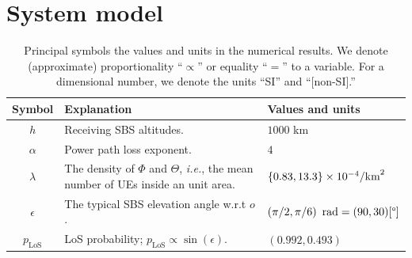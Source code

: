 \documentclass[lettersize,journal]{IEEEtran}
\newcommand{\rEarth}{R_{\oplus}}
\newcommand{\R}{\mathbb{R}}
\begin{document}







\section{System model}


\begin{table}
   \captionsetup{size=footnotesize}
   \caption{Principal symbols the values and units in the numerical results. We denote (approximate) proportionality ``$\propto$'' or equality ``$=$'' to a variable. For a dimensional number, we denote the units ``SI'' and ``[non-SI].''}
     \label{table:parameters}
  \begin{center}
    \begin{tabular}{c|p{4.5cm}|p{1.9cm}}
      \toprule
      Symbol& Explanation &Values and units
      \\ 
      \hline 
      $h$ & Receiving SBS altitudes. &$1000$ km  \\
      $\alpha$ &Power path loss exponent.& $4$\\
      $\lambda$ & The density of $\Phi$ and $\Theta$, \textit{i.e.}, the mean number of UEs inside an unit area.&$\{0.83,13.3\} \times\break 10^{-4}\text{/km}^2$\\
      $\epsilon$& The typical SBS elevation angle w.r.t $\textit{o}$.&$\left({\pi}/{2},{\pi}/{6}\right)\text{ rad}\break=(90,30)[\degree]$\\
      $p_{\text{LoS}}$& LoS probability; $p_{\text{LoS}} \propto \sin(\epsilon)$. & $(0.992,0.493)$\\

\end{tabular}
\end{center}
\end{table}
\end{document}
